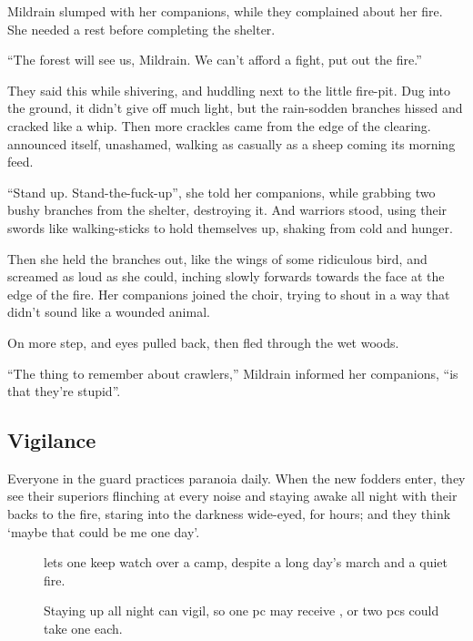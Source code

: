 \begin{multicols}{2}
\begin{exampletext}
  Mildrain slumped with her companions, while they complained about her fire.
  She needed a rest before completing the shelter.

  ``The forest will see us, Mildrain.
  We can't afford a fight, put out the fire.''

  They said this while shivering, and huddling next to the little fire-pit.
  Dug into the ground, it didn't give off much light, but the rain-sodden branches hissed and cracked like a whip.
  Then more crackles came from the edge of the clearing.
   announced itself, unashamed, walking as casually as a sheep coming its morning feed.

  ``Stand up.
  Stand-the-fuck-up'', she told her companions, while grabbing two bushy branches from the shelter, destroying it.
  And warriors stood, using their swords like walking-sticks to hold themselves up, shaking from cold and hunger.

  Then she held the branches out, like the wings of some ridiculous bird, and screamed as loud as she could, inching slowly forwards towards the face at the edge of the fire.
  Her companions joined the choir, trying to shout in a way that didn't sound like a wounded animal.

  On more step, and eyes pulled back, then fled through the wet woods.

  ``The thing to remember about \glspl{crawler},''
  Mildrain informed her companions,
  ``is that they're stupid''.

\end{exampletext}

\subsection{Vigilance}

Everyone in the \gls{guard} practices paranoia daily.
When the new \glspl{fodder} enter, they see their superiors flinching at every noise and staying awake all night with their backs to the fire, staring into the darkness wide-eyed, for hours; and they think `maybe that could be me one day'.

\begin{description}
  \item[]
    lets one keep watch over a camp, despite a long day's march and a quiet fire.

    Staying up all night can \glsdesc{vigil}, so one \gls{pc} may receive , or two \glspl{pc} could take one each.


\end{description}
\end{multicols}
